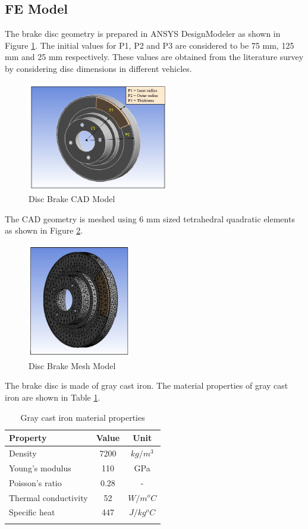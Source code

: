 \documentclass[12pt]{article}
\begin{document}
\subsection{FE Model}
The brake disc geometry is prepared in ANSYS DesignModeler as shown in Figure \ref{cad}. The initial values for P1, P2 and P3 are considered to be 75 mm, 125 mm and 25 mm respectively. These values are obtained from the literature survey by considering disc dimensions in different vehicles.
\begin{figure}[H]
\begin{center}
\includegraphics[width=0.55\textwidth]{cad.jpg}
\caption{Disc Brake CAD Model}
\label{cad}
\end{center}
\end{figure}
The CAD geometry is meshed using 6 mm sized tetrahedral quadratic elements as shown in Figure \ref{mesh}.
\begin{figure}[H]
\begin{center}
\includegraphics[width=0.4\textwidth]{mesh.jpg}
\caption{Disc Brake Mesh Model}
\label{mesh}
\end{center}
\end{figure}
The brake disc is made of gray cast iron. The material properties of gray cast iron are shown in Table \ref{mat}.
\begin{longtable}{|l|c|c|}
\hline 
\textbf{Property} & \textbf{Value} & \textbf{Unit}\\
\hline
Density & 7200 & $kg/m^{3}$ \\
\hline
Young's modulus & 110 & GPa \\
\hline
Poisson's ratio & 0.28 & -\\
\hline
Thermal conductivity & 52 & $W/m^{o}C$ \\
\hline
Specific heat & 447 & $J/kg^{o}C$  \\
\hline
\caption{Gray cast iron material properties}
\label{mat}
\end{longtable}
\end{document}
